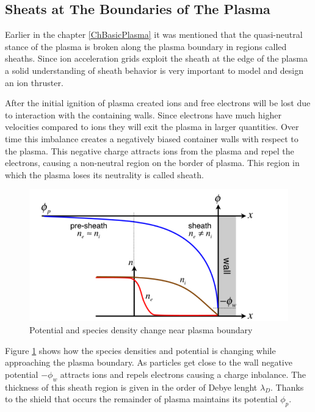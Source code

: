


\subsection{Sheats at The Boundaries of The Plasma} \label{ch:sheaths}

Earlier in the chapter \ref{ChBasicPlasma} it was mentioned that the quasi-neutral stance of the plasma is broken along the plasma boundary in regions called sheaths. Since ion acceleration grids exploit the sheath at the edge of the plasma a solid understanding of sheath behavior is very important to model and design an ion thruster.

After the initial ignition of plasma created ions and free electrons will be lost due to interaction with the containing walls. Since electrons have much higher velocities compared to ions they will exit the plasma in larger quantities. Over time this imbalance creates a negatively biased container walls with respect to the plasma. This negative charge attracts ions from the plasma and repel the electrons, causing a non-neutral region on the border of plasma. This region in which the plasma loses its neutrality is called sheath\cite{lara2016design}.

\begin{figure}[ht]
    \centering
    \includegraphics[scale=0.75]{fig/sheath.png}
    \caption[Potential and species density change near plasma boundary]{Potential and species density change near plasma boundary\cite{lara2016design}}
    \label{fig:sheathgraph}
\end{figure}
\newpage
Figure \ref{fig:sheathgraph} shows how the species densities and potential is changing while approaching the plasma boundary. As particles get close to the wall negative potential $-\phi_w$ attracts ions and repels electrons causing a charge inbalance. The thickness of this sheath region is given in the order of Debye lenght $\lambda_D$\cite{goebel2008fundamentals}. Thanks to the shield that occurs the remainder of plasma maintains its potential $\phi_p$. 

